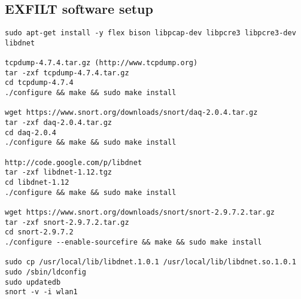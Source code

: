 \subsection{EXFILT software setup}
\begin{verbatim}
sudo apt-get install -y flex bison libpcap-dev libpcre3 libpcre3-dev libdnet

tcpdump-4.7.4.tar.gz (http://www.tcpdump.org)
tar -zxf tcpdump-4.7.4.tar.gz
cd tcpdump-4.7.4
./configure && make && sudo make install

wget https://www.snort.org/downloads/snort/daq-2.0.4.tar.gz
tar -zxf daq-2.0.4.tar.gz
cd daq-2.0.4
./configure && make && sudo make install

http://code.google.com/p/libdnet
tar -zxf libdnet-1.12.tgz
cd libdnet-1.12
./configure && make && sudo make install

wget https://www.snort.org/downloads/snort/snort-2.9.7.2.tar.gz
tar -zxf snort-2.9.7.2.tar.gz
cd snort-2.9.7.2
./configure --enable-sourcefire && make && sudo make install

sudo cp /usr/local/lib/libdnet.1.0.1 /usr/local/lib/libdnet.so.1.0.1
sudo /sbin/ldconfig
sudo updatedb
snort -v -i wlan1

\end{verbatim}


